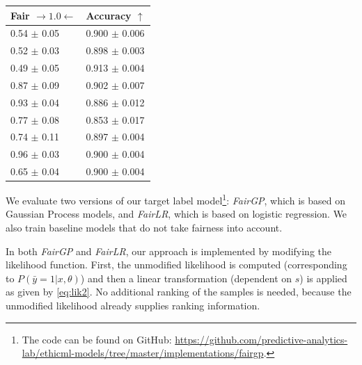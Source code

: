 \begin{table}[tb]
{\begin{tabular}{l@{\hskip 0.25cm}l}
    \toprule
    Fair $\rightarrow 1.0 \leftarrow$ &           Accuracy $\uparrow$\\
    \midrule
       0.54 $\pm$ 0.05 &  0.900 $\pm$ 0.006 \\
       0.52 $\pm$ 0.03 &  0.898 $\pm$ 0.003 \\
       0.49 $\pm$ 0.05 &  0.913 $\pm$ 0.004 \\
       0.87 $\pm$ 0.09 &  0.902 $\pm$ 0.007 \\
       0.93 $\pm$ 0.04 &  0.886 $\pm$ 0.012 \\
       0.77 $\pm$ 0.08 &  0.853 $\pm$ 0.017 \\
       0.74 $\pm$ 0.11 &  0.897 $\pm$ 0.004 \\
       0.96 $\pm$ 0.03 &  0.900 $\pm$ 0.004 \\
       0.65 $\pm$ 0.04 &  0.900 $\pm$ 0.004 \\
    \bottomrule
  \end{tabular}%
}
\end{table}%
We evaluate two versions of our target label model\footnote{%
The code %
can be found on GitHub: \url{https://github.com/predictive-analytics-lab/ethicml-models/tree/master/implementations/fairgp}.
}:
\emph{FairGP}, which is based on Gaussian Process models, and \emph{FairLR}, which is based on logistic regression.
We also train baseline models that do not take fairness into account.

In both \emph{FairGP} and \emph{FairLR}, our approach is implemented by modifying the likelihood function.
First, the unmodified likelihood is computed (corresponding to $P(\bar{y}=1|x,\theta)$)
and then a linear transformation (dependent on $s$) is applied as given by \eqref{eq:lik2}.
No additional ranking of the samples is needed, because the unmodified likelihood already supplies ranking information.

